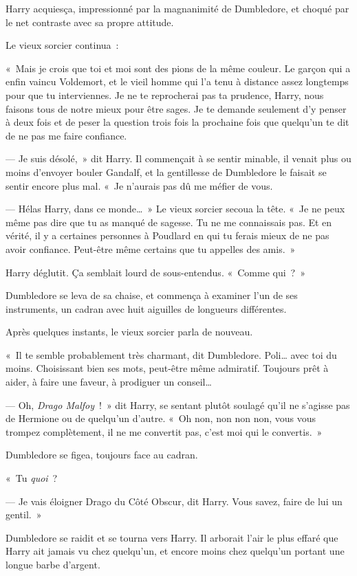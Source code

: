 Harry acquiesça, impressionné par la magnanimité de Dumbledore, et choqué par le net contraste avec sa propre attitude.

Le vieux sorcier continua~:

«~Mais je crois que toi et moi sont des pions de la même couleur. Le garçon qui a enfin vaincu Voldemort, et le vieil homme qui l'a tenu à distance assez longtemps pour que tu interviennes. Je ne te reprocherai pas ta prudence, Harry, nous faisons tous de notre mieux pour être sages. Je te demande seulement d'y penser à deux fois et de peser la question trois fois la prochaine fois que quelqu'un te dit de ne pas me faire confiance.

--- Je suis désolé,~» dit Harry. Il commençait à se sentir minable, il venait plus ou moins d'envoyer bouler Gandalf, et la gentillesse de Dumbledore le faisait se sentir encore plus mal. «~Je n'aurais pas dû me méfier de vous.

--- Hélas Harry, dans ce monde…~» Le vieux sorcier secoua la tête. «~Je ne peux même pas dire que tu as manqué de sagesse. Tu ne me connaissais pas. Et en vérité, il y a certaines personnes à Poudlard en qui tu ferais mieux de ne pas avoir confiance. Peut-être même certains que tu appelles des amis.~»

Harry déglutit. Ça semblait lourd de sous-entendus. «~Comme qui~?~»

Dumbledore se leva de sa chaise, et commença à examiner l'un de ses instruments, un cadran avec huit aiguilles de longueurs différentes.

Après quelques instants, le vieux sorcier parla de nouveau.

«~Il te semble probablement très charmant, dit Dumbledore. Poli… avec toi du moins. Choisissant bien ses mots, peut-être même admiratif. Toujours prêt à aider, à faire une faveur, à prodiguer un conseil…

--- Oh, \emph{Drago Malfoy}~!~» dit Harry, se sentant plutôt soulagé qu'il ne s'agisse pas de Hermione ou de quelqu'un d'autre. «~Oh non, non non non, vous vous trompez complètement, il ne me convertit pas, c'est moi qui le convertis.~»

Dumbledore se figea, toujours face au cadran.

«~Tu \emph{quoi}~?

--- Je vais éloigner Drago du Côté Obscur, dit Harry. Vous savez, faire de lui un gentil.~»

Dumbledore se raidit et se tourna vers Harry. Il arborait l'air le plus effaré que Harry ait jamais vu chez quelqu'un, et encore moins chez quelqu'un portant une longue barbe d'argent.

